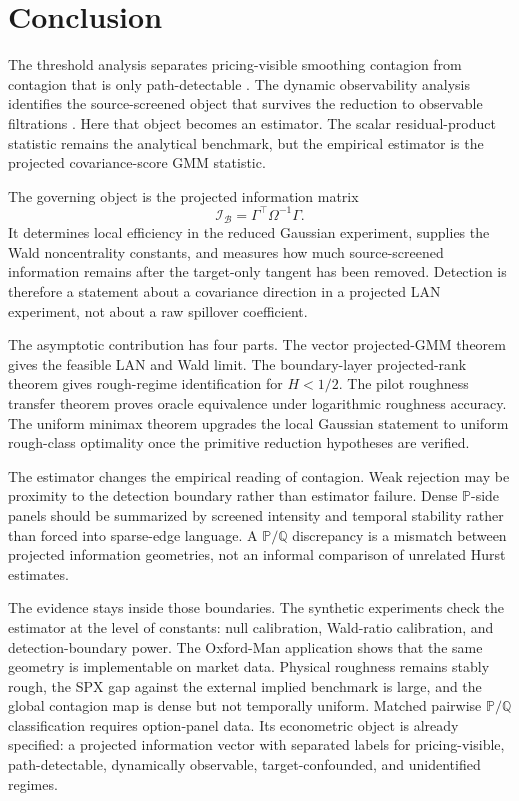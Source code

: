 \documentclass[11pt,a4paper]{amsart}
\theoremstyle{plain}
\theoremstyle{definition}
\theoremstyle{remark}
\newcommand{\PP}{\mathbb{P}}
\newcommand{\QQ}{\mathbb{Q}}
\newcommand{\scrB}{\mathcal{B}}
\newcommand{\scrI}{\mathcal{I}}
\begin{document}
\section{Conclusion}

The threshold analysis separates pricing-visible smoothing contagion from contagion that is only
path-detectable \cite{vidal2026latent}.  The dynamic observability analysis identifies the
source-screened object that survives the reduction to observable filtrations
\cite{vidal2026dynamic}.  Here that object becomes an estimator.  The scalar
residual-product statistic remains the analytical benchmark, but the empirical estimator is the
projected covariance-score GMM statistic.

The governing object is the projected information matrix
\[
        \scrI_{\scrB}
        =
        \Gamma^\top\Omega^{-1}\Gamma .
\]
It determines local efficiency in the reduced Gaussian experiment, supplies the Wald noncentrality
constants, and measures how much source-screened information remains after the target-only tangent
has been removed.  Detection is therefore a statement about a covariance direction in a projected
LAN experiment, not about a raw spillover coefficient.

The asymptotic contribution has four parts.  The vector projected-GMM theorem gives the feasible
LAN and Wald limit.  The boundary-layer projected-rank theorem gives rough-regime identification
for \(H<1/2\).  The pilot roughness transfer theorem proves oracle equivalence under logarithmic
roughness accuracy.  The uniform minimax theorem upgrades the local Gaussian statement to uniform
rough-class optimality once the primitive reduction hypotheses are verified.

The estimator changes the empirical reading of contagion.  Weak rejection may be proximity to the
detection boundary rather than estimator failure.  Dense \(\PP\)-side panels should be summarized by
screened intensity and temporal stability rather than forced into sparse-edge language.  A
\(\PP/\QQ\) discrepancy is a mismatch between projected information geometries, not an informal
comparison of unrelated Hurst estimates.

The evidence stays inside those boundaries.  The synthetic experiments check the estimator at the
level of constants: null calibration, Wald-ratio calibration, and detection-boundary power.  The
Oxford-Man application shows that the same geometry is implementable on market data.  Physical
roughness remains stably rough, the SPX gap against the external implied benchmark is large, and the
global contagion map is dense but not temporally uniform.  Matched pairwise \(\PP/\QQ\)
classification requires option-panel data.  Its econometric object is already specified: a
projected information vector with separated labels for pricing-visible, path-detectable,
dynamically observable, target-confounded, and unidentified regimes.
\end{document}

